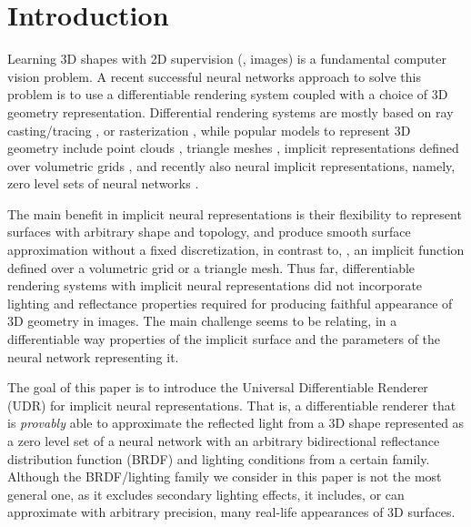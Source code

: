 \documentclass[runningheads]{llncs}
\begin{document}
\section{Introduction}

Learning 3D shapes with 2D supervision (\ie, images) is a fundamental computer vision problem. A recent successful neural networks approach to solve this problem is to use a differentiable rendering system coupled with a choice of 3D geometry representation. Differential rendering systems are mostly based on ray casting/tracing \cite{sitzmann2019scene,niemeyer2019differentiable,li2018differentiable,liu2019learning,saito2019pifu,liu2019dist}, or rasterization  \cite{loper2014opendr,kato2018neural,genova2018unsupervised,liu2019soft_b,chen2019learning}, while popular models to represent 3D geometry include point clouds \cite{yifan2019differentiable}, triangle meshes \cite{chen2019learning}, implicit representations defined over volumetric grids \cite{jiang2019sdfdiff}, and recently also neural implicit representations, namely, zero level sets of neural networks \cite{liu2019learning,niemeyer2019differentiable}. 

The main benefit in implicit neural representations is their flexibility to represent surfaces with arbitrary shape and topology, and produce smooth surface approximation without a fixed discretization, in contrast to, \eg, an implicit function defined over a volumetric grid or a triangle mesh. Thus far, differentiable rendering systems with implicit neural representations \cite{liu2019learning,liu2019dist,niemeyer2019differentiable} did not incorporate lighting and reflectance properties required for producing faithful appearance of 3D geometry in images. The main challenge seems to be relating, in a differentiable way properties of the implicit surface and the parameters of the neural network representing it. 

The goal of this paper is to introduce the Universal Differentiable Renderer (UDR) for implicit neural representations. That is, a differentiable renderer that is \emph{provably} able to approximate the reflected light from a 3D shape represented as a zero level set of a neural network with an arbitrary bidirectional reflectance distribution function (BRDF) and lighting conditions from a certain family. Although the BRDF/lighting family we consider in this paper is not the most general one, as it excludes secondary lighting effects, it includes, or can approximate with arbitrary precision, many real-life appearances of 3D surfaces. 
\end{document}
